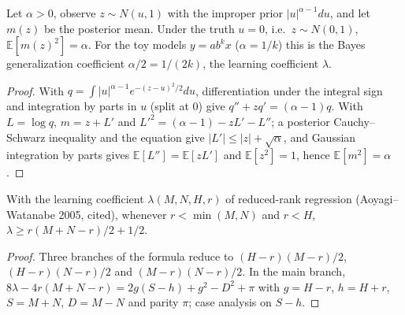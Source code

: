 \begin{theorem}\label{thm:bayes_scale_invariant}
\leanok
Let $\alpha>0$, observe $z\sim N(u,1)$ with the improper prior $|u|^{\alpha-1}du$, and let
$m(z)$ be the posterior mean. Under the truth $u=0$, i.e.\ $z\sim N(0,1)$,
$\mathbb E[m(z)^2]=\alpha$. For the toy models $y=ab^kx$ ($\alpha=1/k$) this is the
Bayes generalization coefficient $\alpha/2=1/(2k)$, the learning coefficient $\lambda$.
\end{theorem}
\begin{proof}
\leanok
With $q=\int|u|^{\alpha-1}e^{-(z-u)^2/2}du$, differentiation under the integral sign
and integration by parts in $u$ (split at $0$) give $q''+zq'=(\alpha-1)q$. With
$L=\log q$, $m=z+L'$ and $L'^2=(\alpha-1)-zL'-L''$; a posterior Cauchy--Schwarz
inequality and the equation give $|L'|\le|z|+\sqrt\alpha$, and Gaussian integration by
parts gives $\mathbb E[L'']=\mathbb E[zL']$ and $\mathbb E[z^2]=1$, hence
$\mathbb E[m^2]=\alpha$.
\end{proof}

\begin{lemma}\label{lem:rrr_rlct_gain}
\leanok
With the learning coefficient $\lambda(M,N,H,r)$ of reduced-rank regression
(Aoyagi--Watanabe 2005, cited), whenever $r<\min(M,N)$ and $r<H$,
$\lambda\ge r(M+N-r)/2+1/2$.
\end{lemma}
\begin{proof}
\leanok
Three branches of the formula reduce to $(H-r)(M-r)/2$, $(H-r)(N-r)/2$ and
$(M-r)(N-r)/2$. In the main branch, $8\lambda-4r(M+N-r)=2g(S-h)+g^2-D^2+\pi$ with
$g=H-r$, $h=H+r$, $S=M+N$, $D=M-N$ and parity $\pi$; case analysis on $S-h$.
\end{proof}

